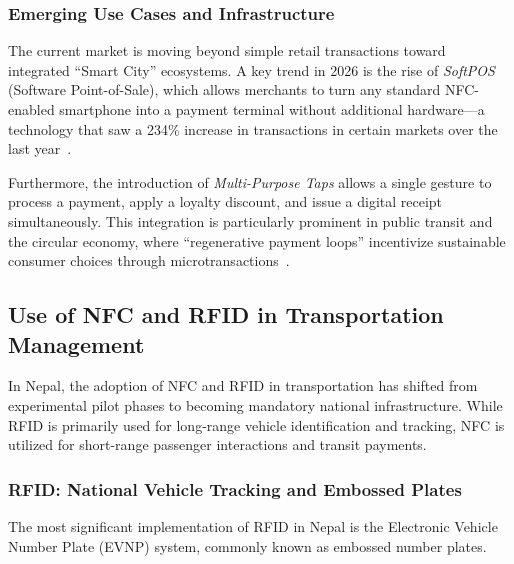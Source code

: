 \documentclass[sigconf, nonacm]{acmart}
\begin{document}
\subsubsection{Emerging Use Cases and Infrastructure}


The current market is moving beyond simple retail transactions toward integrated ``Smart City'' ecosystems. A key trend in 2026 is the rise of \textit{SoftPOS} (Software Point-of-Sale), which allows merchants to turn any standard NFC-enabled smartphone into a payment terminal without additional hardware---a technology that saw a 234\% increase in transactions in certain markets over the last year~\cite{valero2025rise}.

Furthermore, the introduction of \textit{Multi-Purpose Taps} allows a single gesture to process a payment, apply a loyalty discount, and issue a digital receipt simultaneously. This integration is particularly prominent in public transit and the circular economy, where ``regenerative payment loops'' incentivize sustainable consumer choices through microtransactions~\cite{hyman2025future}.

\subsection{Use of NFC and RFID in Transportation Management}

In Nepal, the adoption of NFC and RFID in transportation has shifted from experimental pilot phases to becoming mandatory national infrastructure. While RFID is primarily used for long-range vehicle identification and tracking, NFC is utilized for short-range passenger interactions and transit payments.

\subsubsection{RFID: National Vehicle Tracking and Embossed Plates}

The most significant implementation of RFID in Nepal is the Electronic Vehicle Number Plate (EVNP) system, commonly known as embossed number plates.
\end{document}
